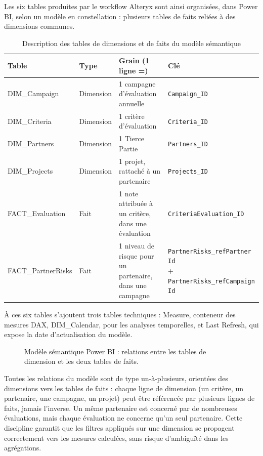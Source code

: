 Les six tables produites par le workflow Alteryx sont ainsi organisées, dans Power BI, 
selon un modèle en constellation : plusieurs tables de faits reliées à des dimensions 
communes.

\begin{table}[htbp]
\centering
\renewcommand{\arraystretch}{1.4}
\begin{tabularx}{\textwidth}{|l|l|X|l|}
\hline
\textbf{Table} & \textbf{Type} & \textbf{Grain (1 ligne =)} & \textbf{Clé} \\
\hline
DIM\_Campaign & Dimension & 1 campagne d'évaluation annuelle & \texttt{Campaign\_ID} \\
\hline
DIM\_Criteria & Dimension & 1 critère d'évaluation & \texttt{Criteria\_ID} \\
\hline
DIM\_Partners & Dimension & 1 Tierce Partie & \texttt{Partners\_ID} \\
\hline
DIM\_Projects & Dimension & 1 projet, rattaché à un partenaire & \texttt{Projects\_ID} \\
\hline
FACT\_Evaluation & Fait & 1 note attribuée à un critère, dans une évaluation & \texttt{CriteriaEvaluation\_ID} \\
\hline
FACT\_PartnerRisks & Fait & 1 niveau de risque pour un partenaire, dans une campagne & \parbox[t]{4.5cm}{\texttt{PartnerRisks\_refPartner Id} \\ + \texttt{PartnerRisks\_refCampaign Id}} \\
\hline
\end{tabularx}
\caption{Description des tables de dimensions et de faits du modèle sémantique}
\end{table}

À ces six tables s'ajoutent trois tables techniques : Measure, conteneur des mesures 
DAX, DIM\_Calendar, pour les analyses temporelles, et Last Refresh, qui expose la date 
d'actualisation du modèle.

\begin{figure}[H]
    \centering
    \caption{ Modèle sémantique Power BI : relations entre les tables de dimension et les deux tables de faits.}
    \label{Modèle_sémantique_Power_BI_relations_entre_les_tables}
\end{figure}

Toutes les relations du modèle sont de type un-à-plusieurs, orientées des dimensions 
vers les tables de faits : chaque ligne de dimension (un critère, un partenaire, une campagne, 
un projet) peut être référencée par plusieurs lignes de faits, jamais l'inverse. Un même 
partenaire est concerné par de nombreuses évaluations, mais chaque évaluation ne concerne 
qu'un seul partenaire. Cette discipline garantit que les filtres appliqués sur une dimension se 
propagent correctement vers les mesures calculées, sans risque d'ambiguïté dans les 
agrégations.\\

